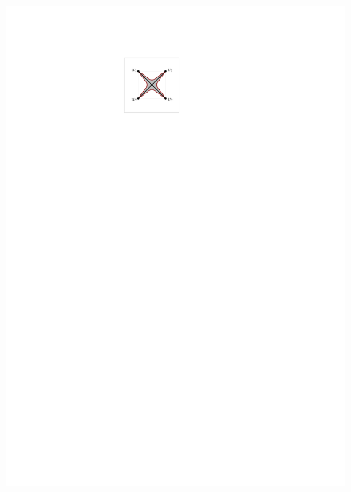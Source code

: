 \begin{figure}[htb]
    \centering
    \begin{minipage}[b]{.24\textwidth}
        \centering
        \includegraphics[width=\textwidth,page=1]{images/3planar_one_crossing}
        \subcaption{~}\label{fig:3_planar_one_crossing_before}
    \end{minipage}
    \begin{minipage}[b]{.24\textwidth}
        \centering

\end{minipage}
\end{figure}
